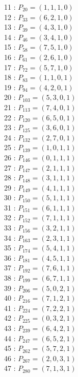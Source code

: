 \documentclass{article}
\begin{document}
{\begin{multicols}{3}
11 : $P_{20}=( 1, 1, 1, 0 )$\\
12 : $P_{33}=( 6, 2, 1, 0 )$\\
13 : $P_{39}=( 4, 3, 1, 0 )$\\
14 : $P_{46}=( 3, 4, 1, 0 )$\\
15 : $P_{58}=( 7, 5, 1, 0 )$\\
16 : $P_{61}=( 2, 6, 1, 0 )$\\
17 : $P_{72}=( 5, 7, 1, 0 )$\\
18 : $P_{83}=( 1, 1, 0, 1 )$\\
19 : $P_{94}=( 4, 2, 0, 1 )$\\
20 : $P_{103}=( 5, 3, 0, 1 )$\\
21 : $P_{113}=( 7, 4, 0, 1 )$\\
22 : $P_{120}=( 6, 5, 0, 1 )$\\
23 : $P_{125}=( 3, 6, 0, 1 )$\\
24 : $P_{132}=( 2, 7, 0, 1 )$\\
25 : $P_{139}=( 1, 0, 1, 1 )$\\
26 : $P_{146}=( 0, 1, 1, 1 )$\\
27 : $P_{147}=( 2, 1, 1, 1 )$\\
28 : $P_{148}=( 3, 1, 1, 1 )$\\
29 : $P_{149}=( 4, 1, 1, 1 )$\\
30 : $P_{150}=( 5, 1, 1, 1 )$\\
31 : $P_{151}=( 6, 1, 1, 1 )$\\
32 : $P_{152}=( 7, 1, 1, 1 )$\\
33 : $P_{156}=( 3, 2, 1, 1 )$\\
34 : $P_{163}=( 2, 3, 1, 1 )$\\
35 : $P_{174}=( 5, 4, 1, 1 )$\\
36 : $P_{181}=( 4, 5, 1, 1 )$\\
37 : $P_{192}=( 7, 6, 1, 1 )$\\
38 : $P_{199}=( 6, 7, 1, 1 )$\\
39 : $P_{206}=( 5, 0, 2, 1 )$\\
40 : $P_{216}=( 7, 1, 2, 1 )$\\
41 : $P_{224}=( 7, 2, 2, 1 )$\\
42 : $P_{225}=( 0, 3, 2, 1 )$\\
43 : $P_{239}=( 6, 4, 2, 1 )$\\
44 : $P_{247}=( 6, 5, 2, 1 )$\\
45 : $P_{262}=( 5, 7, 2, 1 )$\\
46 : $P_{267}=( 2, 0, 3, 1 )$\\
47 : $P_{280}=( 7, 1, 3, 1 )$\\

\end{multicols}}
\end{document}
